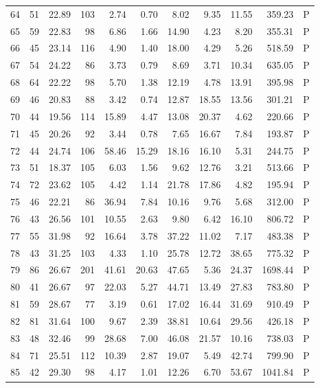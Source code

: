 \begin{table}[ht]
\begin{tabular}{rrrrrrrrrrl}
  64 &  51 & 22.89 & 103 & 2.74 & 0.70 & 8.02 & 9.35 & 11.55 & 359.23 & P \\ 
  65 &  59 & 22.83 &  98 & 6.86 & 1.66 & 14.90 & 4.23 & 8.20 & 355.31 & P \\ 
  66 &  45 & 23.14 & 116 & 4.90 & 1.40 & 18.00 & 4.29 & 5.26 & 518.59 & P \\ 
  67 &  54 & 24.22 &  86 & 3.73 & 0.79 & 8.69 & 3.71 & 10.34 & 635.05 & P \\ 
  68 &  64 & 22.22 &  98 & 5.70 & 1.38 & 12.19 & 4.78 & 13.91 & 395.98 & P \\ 
  69 &  46 & 20.83 &  88 & 3.42 & 0.74 & 12.87 & 18.55 & 13.56 & 301.21 & P \\ 
  70 &  44 & 19.56 & 114 & 15.89 & 4.47 & 13.08 & 20.37 & 4.62 & 220.66 & P \\ 
  71 &  45 & 20.26 &  92 & 3.44 & 0.78 & 7.65 & 16.67 & 7.84 & 193.87 & P \\ 
  72 &  44 & 24.74 & 106 & 58.46 & 15.29 & 18.16 & 16.10 & 5.31 & 244.75 & P \\ 
  73 &  51 & 18.37 & 105 & 6.03 & 1.56 & 9.62 & 12.76 & 3.21 & 513.66 & P \\ 
  74 &  72 & 23.62 & 105 & 4.42 & 1.14 & 21.78 & 17.86 & 4.82 & 195.94 & P \\ 
  75 &  46 & 22.21 &  86 & 36.94 & 7.84 & 10.16 & 9.76 & 5.68 & 312.00 & P \\ 
  76 &  43 & 26.56 & 101 & 10.55 & 2.63 & 9.80 & 6.42 & 16.10 & 806.72 & P \\ 
  77 &  55 & 31.98 &  92 & 16.64 & 3.78 & 37.22 & 11.02 & 7.17 & 483.38 & P \\ 
  78 &  43 & 31.25 & 103 & 4.33 & 1.10 & 25.78 & 12.72 & 38.65 & 775.32 & P \\ 
  79 &  86 & 26.67 & 201 & 41.61 & 20.63 & 47.65 & 5.36 & 24.37 & 1698.44 & P \\ 
  80 &  41 & 26.67 &  97 & 22.03 & 5.27 & 44.71 & 13.49 & 27.83 & 783.80 & P \\ 
  81 &  59 & 28.67 &  77 & 3.19 & 0.61 & 17.02 & 16.44 & 31.69 & 910.49 & P \\ 
  82 &  81 & 31.64 & 100 & 9.67 & 2.39 & 38.81 & 10.64 & 29.56 & 426.18 & P \\ 
  83 &  48 & 32.46 &  99 & 28.68 & 7.00 & 46.08 & 21.57 & 10.16 & 738.03 & P \\ 
  84 &  71 & 25.51 & 112 & 10.39 & 2.87 & 19.07 & 5.49 & 42.74 & 799.90 & P \\ 
  85 &  42 & 29.30 &  98 & 4.17 & 1.01 & 12.26 & 6.70 & 53.67 & 1041.84 & P \\ 

\end{tabular}
\end{table}
